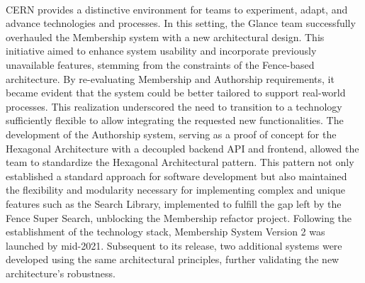 \paragraph{} CERN provides a distinctive environment for teams to experiment, adapt, and advance technologies and processes. In this setting, the Glance team successfully overhauled the Membership system with a new architectural design. This initiative aimed to enhance system usability and incorporate previously unavailable features, stemming from the constraints of the Fence-based architecture. By re-evaluating Membership and Authorship requirements, it became evident that the system could be better tailored to support real-world processes. This realization underscored the need to transition to a technology sufficiently flexible to allow integrating the requested new functionalities. The development of the Authorship system, serving as a proof of concept for the Hexagonal Architecture with a decoupled backend API and frontend, allowed the team to standardize the Hexagonal Architectural pattern. This pattern not only established a standard approach for software development but also maintained the flexibility and modularity necessary for implementing complex and unique features such as the Search Library, implemented to fulfill the gap left by the Fence Super Search, unblocking the Membership refactor project. Following the establishment of the technology stack, Membership System Version 2 was launched by mid-2021. Subsequent to its release, two additional systems were developed using the same architectural principles, further validating the new architecture's robustness.

